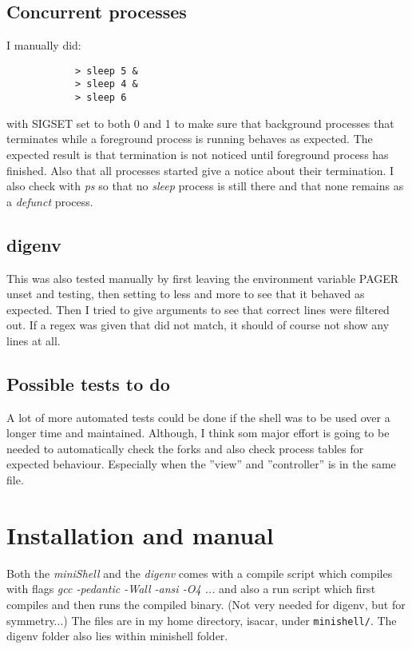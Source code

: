 \documentclass{article}
\begin{document}
    \subsection{Concurrent processes}
        I manually did:
        \begin{verbatim}
            > sleep 5 &
            > sleep 4 &
            > sleep 6
        \end{verbatim}
        with SIGSET set to both 0 and 1 to make sure that background processes
        that terminates while a foreground process is running behaves as
        expected. The expected result is that termination is not noticed until
        foreground process has finished. Also that all processes started give a
        notice about their termination. I also check with \emph{ps} so that no
        \emph{sleep} process is still there and that none remains as a
        \emph{defunct} process.

    \subsection{digenv}
        This was also tested manually by first leaving the environment variable
        PAGER unset and testing, then setting to less and more to see that it
        behaved as expected. Then I tried to give arguments to see that correct
        lines were filtered out. If a regex was given that did not match, it
        should of course not show any lines at all.

    \subsection{Possible tests to do}
        A lot of more automated tests could be done if the shell was to be used
        over a longer time and maintained. Although, I think som major effort
        is going to be needed to automatically check the forks and also check
        process tables for expected behaviour. Especially when the ''view'' and
        ''controller'' is in the same file.
        

\section{Installation and manual}
    Both the \emph{miniShell} and the \emph{digenv} comes with a compile script
    which compiles with flags \emph{gcc -pedantic -Wall -ansi -O4 ...} and also a
    run script which first compiles and then runs the compiled binary. (Not very
    needed for digenv, but for symmetry...) The files are in my home directory,
    isacar, under \texttt{minishell/}. The digenv folder also lies within minishell
    folder.
\end{document}
